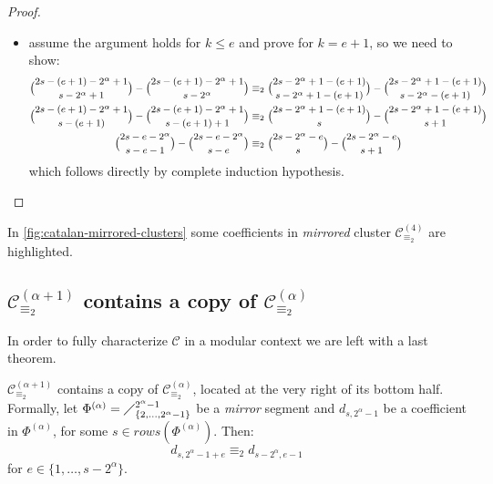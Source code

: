 \begin{proof}
\begin{itemize}
        \item assume the argument holds for $k\leq e$ and prove for $k=e+1$, so we need to show:
            \begin{displaymath}
                \footnotesize
                \begin{split}
                    {{2s-(e+1)-2^{{\alpha}}+1}\choose{s-2^{{\alpha}}+1}}
                        - {{2s-(e+1)-2^{{\alpha}}+1}\choose{s-2^{{\alpha}}}}
                    &\equiv_{2}
                    {{2s-2^{{\alpha}}+1-(e+1)}\choose{s-2^{{\alpha}}+1-(e+1)}}
                        - {{2s-2^{{\alpha}}+1-(e+1)}\choose{s-2^{{\alpha}}-(e+1)}}\\
                    {{2s-(e+1)-2^{{\alpha}}+1}\choose{s-(e+1)}}
                        - {{2s-(e+1)-2^{{\alpha}}+1}\choose{s-(e+1)+1}}
                    &\equiv_{2}
                    {{2s-2^{{\alpha}}+1-(e+1)}\choose{s}}
                        - {{2s-2^{{\alpha}}+1-(e+1)}\choose{s+1}}\\
                    {{2s-e-2^{{\alpha}}}\choose{s-e-1}}
                        - {{2s-e-2^{{\alpha}}}\choose{s-e}}
                    &\equiv_{2}
                    {{2s-2^{{\alpha}}-e}\choose{s}}
                        - {{2s-2^{{\alpha}}-e}\choose{s+1}}\\
                \end{split}
            \end{displaymath}
            which follows directly by complete induction hypothesis.
\end{itemize}

\end{proof}


In \autoref{fig:catalan-mirrored-clusters} some coefficients in \emph{mirrored}
cluster $\mathcal{C}_{\equiv_{2}}^{(4)}$ are highlighted.

\subsection{$\mathcal{C}_{\equiv_{2}}^{(\alpha+1)}$
    contains a copy of $\mathcal{C}_{\equiv_{2}}^{(\alpha)}$}

In order to fully characterize $\mathcal{C}$ in a modular context we are
left with a last theorem.

\begin{theorem}
    $\mathcal{C}_{\equiv_{2}}^{(\alpha+1)}$
    contains a copy of $\mathcal{C}_{\equiv_{2}}^{(\alpha)}$,
    located at the very right of its bottom half. Formally,
    let $\Phi^{(\alpha)}=\diagup_{\lbrace 2,\ldots,2^{\alpha}-1\rbrace}^{2^{\alpha}-1}$
    be a \emph{mirror} segment and $d_{s,2^{{\alpha}}-1}$
    be a coefficient in $\Phi^{(\alpha)}$, for some $s\in rows\left(\Phi^{(\alpha)}\right)$. Then:
    \begin{displaymath}
        d_{s,2^{{\alpha}}-1+e} \equiv_{2} d_{s-2^{{\alpha}},e-1}
    \end{displaymath}
    for $e\in\lbrace1,\ldots,s-2^{{\alpha}}\rbrace$.
    \label{thm:principal:cluster:copy:containment}
\end{theorem}

